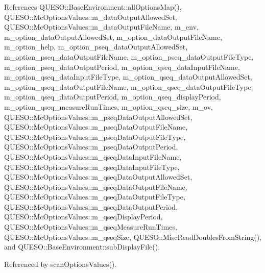 References Q\-U\-E\-S\-O\-::\-Base\-Environment\-::all\-Options\-Map(), Q\-U\-E\-S\-O\-::\-Mc\-Options\-Values\-::m\-\_\-data\-Output\-Allowed\-Set, Q\-U\-E\-S\-O\-::\-Mc\-Options\-Values\-::m\-\_\-data\-Output\-File\-Name, m\-\_\-env, m\-\_\-option\-\_\-data\-Output\-Allowed\-Set, m\-\_\-option\-\_\-data\-Output\-File\-Name, m\-\_\-option\-\_\-help, m\-\_\-option\-\_\-pseq\-\_\-data\-Output\-Allowed\-Set, m\-\_\-option\-\_\-pseq\-\_\-data\-Output\-File\-Name, m\-\_\-option\-\_\-pseq\-\_\-data\-Output\-File\-Type, m\-\_\-option\-\_\-pseq\-\_\-data\-Output\-Period, m\-\_\-option\-\_\-qseq\-\_\-data\-Input\-File\-Name, m\-\_\-option\-\_\-qseq\-\_\-data\-Input\-File\-Type, m\-\_\-option\-\_\-qseq\-\_\-data\-Output\-Allowed\-Set, m\-\_\-option\-\_\-qseq\-\_\-data\-Output\-File\-Name, m\-\_\-option\-\_\-qseq\-\_\-data\-Output\-File\-Type, m\-\_\-option\-\_\-qseq\-\_\-data\-Output\-Period, m\-\_\-option\-\_\-qseq\-\_\-display\-Period, m\-\_\-option\-\_\-qseq\-\_\-measure\-Run\-Times, m\-\_\-option\-\_\-qseq\-\_\-size, m\-\_\-ov, Q\-U\-E\-S\-O\-::\-Mc\-Options\-Values\-::m\-\_\-pseq\-Data\-Output\-Allowed\-Set, Q\-U\-E\-S\-O\-::\-Mc\-Options\-Values\-::m\-\_\-pseq\-Data\-Output\-File\-Name, Q\-U\-E\-S\-O\-::\-Mc\-Options\-Values\-::m\-\_\-pseq\-Data\-Output\-File\-Type, Q\-U\-E\-S\-O\-::\-Mc\-Options\-Values\-::m\-\_\-pseq\-Data\-Output\-Period, Q\-U\-E\-S\-O\-::\-Mc\-Options\-Values\-::m\-\_\-qseq\-Data\-Input\-File\-Name, Q\-U\-E\-S\-O\-::\-Mc\-Options\-Values\-::m\-\_\-qseq\-Data\-Input\-File\-Type, Q\-U\-E\-S\-O\-::\-Mc\-Options\-Values\-::m\-\_\-qseq\-Data\-Output\-Allowed\-Set, Q\-U\-E\-S\-O\-::\-Mc\-Options\-Values\-::m\-\_\-qseq\-Data\-Output\-File\-Name, Q\-U\-E\-S\-O\-::\-Mc\-Options\-Values\-::m\-\_\-qseq\-Data\-Output\-File\-Type, Q\-U\-E\-S\-O\-::\-Mc\-Options\-Values\-::m\-\_\-qseq\-Data\-Output\-Period, Q\-U\-E\-S\-O\-::\-Mc\-Options\-Values\-::m\-\_\-qseq\-Display\-Period, Q\-U\-E\-S\-O\-::\-Mc\-Options\-Values\-::m\-\_\-qseq\-Measure\-Run\-Times, Q\-U\-E\-S\-O\-::\-Mc\-Options\-Values\-::m\-\_\-qseq\-Size, Q\-U\-E\-S\-O\-::\-Misc\-Read\-Doubles\-From\-String(), and Q\-U\-E\-S\-O\-::\-Base\-Environment\-::sub\-Display\-File().



Referenced by scan\-Options\-Values().


